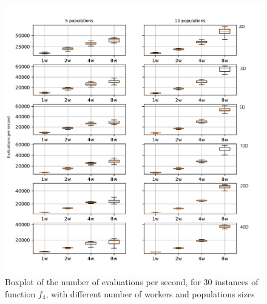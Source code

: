 \documentclass[review]{elsarticle}
\begin{document}
%
%
\begin{figure}[h!tbp]
  \centering
  \includegraphics[width=\textwidth]{evalspersecond}
  \caption{Boxplot of the number of evaluations per second, for 30 instances of function $f_4$, with different number of workers and populations sizes }
   
  \label{fig:spworker}
\end{figure}
\end{document}
